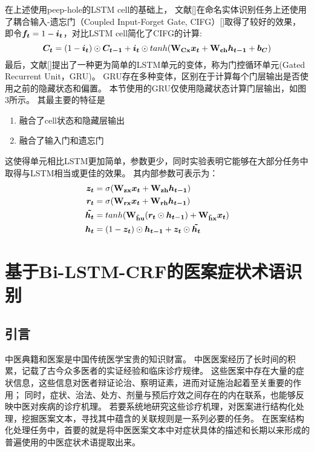 在上述使用peep-hole的LSTM cell的基础上，
文献[]在命名实体识别任务上还使用了耦合输入-遗忘门（Coupled Input-Forget Gate, CIFG）[]取得了较好的效果，
即令$\boldsymbol{f_t} = 1 - \boldsymbol{i_t}$，对比LSTM cell简化了CIFG的计算:
\begin{equation*}
    \boldsymbol{C_t} = (1 - \boldsymbol{i_t})\odot \boldsymbol{C_{t-1}} + \boldsymbol{i_t}\odot tanh(\boldsymbol{\mathbf{W_{Cx}}}\boldsymbol{x_t} + \boldsymbol{\mathbf{W_{ch}}}\boldsymbol{h_{t-1}} + \boldsymbol{b_C})
\end{equation*}
最后，文献[]提出了一种更为简单的LSTM单元的变体，称为门控循环单元(Gated Recurrent Unit，GRU)。
GRU存在多种变体，区别在于计算每个门层输出是否使用之前的隐藏状态和偏置。
本节使用的GRU仅使用隐藏状态计算门层输出，如图3所示。
其最主要的特征是
\begin{enumerate}
    \item 融合了cell状态和隐藏层输出
    \item 融合了输入门和遗忘门
\end{enumerate}
这使得单元相比LSTM更加简单，参数更少，同时实验表明它能够在大部分任务中取得与LSTM相当或更佳的效果。
其内部参数可表示为：
\begin{align*}
    \boldsymbol{z_t} &= \sigma(\boldsymbol{\mathbf{W_{zx}}}\boldsymbol{x_t} + \boldsymbol{\mathbf{W_{zh}}}\boldsymbol{h_{t-1}})\\
    \boldsymbol{r_t} &= \sigma(\boldsymbol{\mathbf{W_{rx}}}\boldsymbol{x_t} + \boldsymbol{\mathbf{W_{rh}}}\boldsymbol{h_{t-1}})\\
    \boldsymbol{\tilde{h_t}} &= tanh(\boldsymbol{\mathbf{W_{\tilde{h}u}}}(\boldsymbol{r_t} \odot \boldsymbol{h_{t-1}}) + \boldsymbol{\mathbf{W_{\tilde{h}x}}}\boldsymbol{x_t})\\
    \boldsymbol{h_t} &= (1 - \boldsymbol{z_t}) \odot \boldsymbol{h_{t-1}} + \boldsymbol{z_t} \odot \boldsymbol{\tilde{h_t}}
\end{align*}

\section{基于Bi-LSTM-CRF的医案症状术语识别}
\subsection{引言}
中医典籍和医案是中国传统医学宝贵的知识财富。
中医医案经历了长时间的积累，记载了古今众多医者的实证经验和临床诊疗规律。
这些医案中存在大量的症状信息，这些信息对医者辩证论治、察明证素，进而对证施治起着至关重要的作用；
同时，症状、治法、处方、剂量与预后疗效之间存在的内在联系，也能够反映中医对疾病的诊疗机理。
若要系统地研究这些诊疗机理，对医案进行结构化处理，挖掘医案文本，寻找其中蕴含的关联规则是一系列必要的任务。
在医案结构化处理任务中，首要的就是将中医医案文本中对症状具体的描述和长期以来形成的普遍使用的中医症状术语提取出来。

